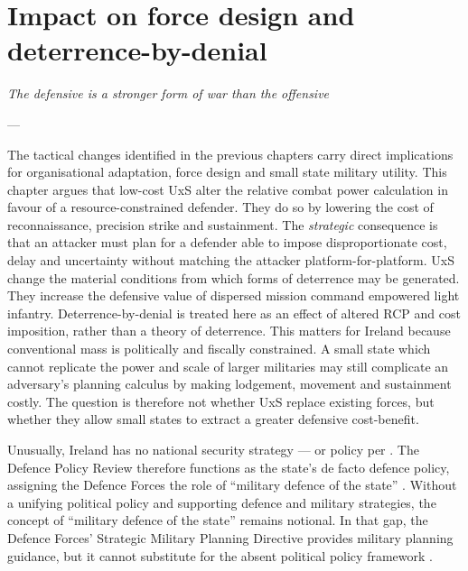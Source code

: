 \chapter{Impact on force design and deterrence-by-denial} 

\begin{center}
	\begin{minipage}{0.6\textwidth}
		\centering\itshape
		The defensive is a stronger form of war than the offensive
		
		\vspace{0.5em}
		--- \textcite[ch.~V]{clausewitz_2006_on_war_project_gutenberg}
	\end{minipage}
\end{center}




The tactical changes identified in the previous chapters carry direct implications for organisational adaptation, force design and small state military utility. This chapter argues that low-cost UxS alter the relative combat power calculation in favour of a resource-constrained defender. They do so by lowering the cost of reconnaissance, precision strike and sustainment. The \textit{strategic} consequence is that an attacker must plan for a defender able to impose disproportionate cost, delay and uncertainty without matching the attacker platform-for-platform. UxS change the material conditions from which forms of deterrence may be generated. They increase the defensive value of dispersed mission command empowered light infantry. Deterrence-by-denial is treated here as an effect of altered RCP and cost imposition, rather than a theory of deterrence. This matters for Ireland because conventional mass is politically and fiscally constrained. A small state which cannot replicate the power and scale of larger militaries may still complicate an adversary's planning calculus by making lodgement, movement and sustainment costly. The question is therefore not whether UxS replace existing forces, but whether they allow small states to extract a greater defensive cost-benefit.

Unusually, Ireland has no national security strategy --- or policy per \textcite{GRAY_2018}. The Defence Policy Review therefore functions as the state's de facto defence policy, assigning the Defence Forces the role of ``military defence of the state''  \parencite[sec. 3.2]{DPR_2024}. Without a unifying political policy and supporting defence and military strategies, the concept of ``military defence of the state'' remains notional. In that gap, the Defence Forces' Strategic Military Planning Directive provides military planning guidance, but it cannot substitute for the absent political policy framework \parencite{SMPD_2025}.


